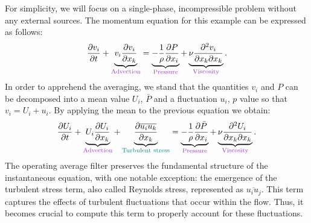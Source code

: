 For simplicity, we will focus on a single-phase, incompressible problem without any external sources. The momentum equation for this example can be expressed as follows:
\begin{equation}\label{eq:qdm-classic}
    \frac{\partial v_i}{\partial t}+\underbrace{v_i\frac{\partial v_i}{\partial x_k}}_{\color{mydarkorchid}\text{Advection}} = \underbrace{-\frac{1}{\rho}\frac{\partial P}{\partial x_i}}_{\color{mydarkorchid}\text{Pressure}} + \underbrace{\nu \frac{\partial^2 v_i}{\partial x_k \partial x_k}}_{\color{mydarkorchid}\text{Viscosity}}.
\end{equation}
In order to apprehend the averaging, we stand that the quantities $v_i$ and $P$ can be decomposed into a mean value $U_i$, $\bar{P}$ and a fluctuation $u_i$, $p$ value so that $v_i=U_i+u_i$. By applying the mean to the previous equation we obtain:
\begin{equation}\label{eq:qdm-turbu}
        \frac{\partial U_i}{\partial t}+\underbrace{U_i\frac{\partial U_i}{\partial x_k}}_{\color{mydarkorchid}\text{Advection}} + \underbrace{\frac{\partial \overline{u_iu_k}}{\partial x_k}}_{\color{myteal}\text{Turbulent stress}} = \underbrace{-\frac{1}{\rho}\frac{\partial \bar{P}}{\partial x_i}}_{\color{mydarkorchid}\text{Pressure}} + \underbrace{\nu \frac{\partial^2 U_i}{\partial x_k \partial x_k}}_{\color{mydarkorchid}\text{Viscosity}}.
\end{equation}
The operating average filter preserves the fundamental structure of the instantaneous equation, with one notable exception: the emergence of the turbulent stress term, also called Reynolds stress, represented as $\overline{u_iu_j}$. This term captures the effects of turbulent fluctuations that occur within the flow. Thus, it becomes crucial to compute this term to properly account for these fluctuations.

